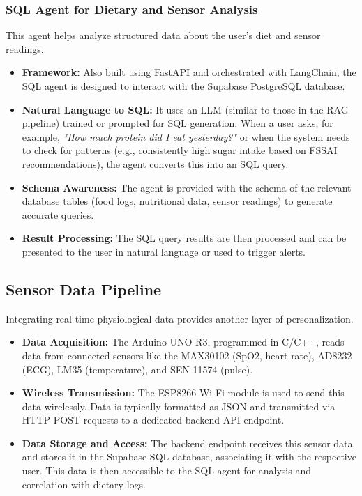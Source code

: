 \subsubsection{SQL Agent for Dietary and Sensor Analysis}
This agent helps analyze structured data about the user's diet and sensor readings.
\begin{itemize}
    \item \textbf{Framework:} Also built using FastAPI and orchestrated with LangChain, the SQL agent is designed to interact with the Supabase PostgreSQL database.
    \item \textbf{Natural Language to SQL:} It uses an LLM (similar to those in the RAG pipeline) trained or prompted for SQL generation. When a user asks, for example, \textit{"How much protein did I eat yesterday?"} or when the system needs to check for patterns (e.g., consistently high sugar intake based on FSSAI recommendations), the agent converts this into an SQL query.
    \item \textbf{Schema Awareness:} The agent is provided with the schema of the relevant database tables (food logs, nutritional data, sensor readings) to generate accurate queries.
    \item \textbf{Result Processing:} The SQL query results are then processed and can be presented to the user in natural language or used to trigger alerts.
\end{itemize}

\subsection{Sensor Data Pipeline}
Integrating real-time physiological data provides another layer of personalization.
\begin{itemize}
    \item \textbf{Data Acquisition:} The Arduino UNO R3, programmed in C/C++, reads data from connected sensors like the MAX30102 (SpO2, heart rate), AD8232 (ECG), LM35 (temperature), and SEN-11574 (pulse).
    \item \textbf{Wireless Transmission:} The ESP8266 Wi-Fi module is used to send this data wirelessly. Data is typically formatted as JSON and transmitted via HTTP POST requests to a dedicated backend API endpoint.
    \item \textbf{Data Storage and Access:} The backend endpoint receives this sensor data and stores it in the Supabase SQL database, associating it with the respective user. This data is then accessible to the SQL agent for analysis and correlation with dietary logs.
\end{itemize}

